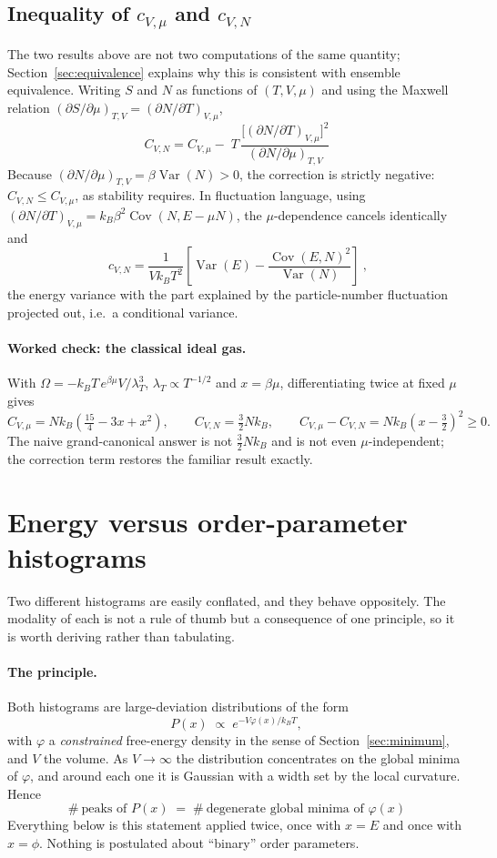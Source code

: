 \documentclass[10pt,a4paper]{article}
\theoremstyle{remark}
\newcommand{\Var}{\operatorname{Var}}
\newcommand{\Cov}{\operatorname{Cov}}
\begin{document}
\subsection{Inequality of \texorpdfstring{$c_{V,\mu}$}{cVmu} and \texorpdfstring{$c_{V,N}$}{cVN}}
\label{sec:caveat}

The two results above are not two computations of the same quantity;
Section~\ref{sec:equivalence} explains why this is consistent with ensemble
equivalence. Writing $S$ and $N$ as functions of $(T,V,\mu)$ and using the
Maxwell relation $(\partial S/\partial\mu)_{T,V}=(\partial N/\partial T)_{V,\mu}$,
\[
\;C_{V,N}=C_{V,\mu}
-\;T\,\frac{\big[(\partial N/\partial T)_{V,\mu}\big]^{2}}
{(\partial N/\partial\mu)_{T,V}}\
\]
Because $(\partial N/\partial\mu)_{T,V}=\beta\Var(N)>0$, the correction is
strictly negative: $C_{V,N}\leq C_{V,\mu}$, as stability requires. In fluctuation
language, using $(\partial N/\partial T)_{V,\mu}=k_B\beta^{2}\Cov(N,E-\mu N)$,
the $\mu$-dependence cancels identically and
\[
\;c_{V,N}=\frac{1}{Vk_BT^{2}}
\left[\Var(E)-\frac{\Cov(E,N)^{2}}{\Var(N)}\right]\ ,
\]
the energy variance with the part explained by the particle-number
fluctuation projected out, i.e.\ a conditional variance.

\paragraph{Worked check: the classical ideal gas.} With
$\Omega=-k_BT\,e^{\beta\mu}V/\lambda_T^{3}$, $\lambda_T\propto T^{-1/2}$ and
$x=\beta\mu$, differentiating twice at fixed $\mu$ gives
\[
C_{V,\mu}=Nk_B\left(\tfrac{15}{4}-3x+x^{2}\right),
\qquad
C_{V,N}=\tfrac{3}{2}Nk_B,
\qquad
C_{V,\mu}-C_{V,N}=Nk_B\left(x-\tfrac{3}{2}\right)^{2}\geq 0 .
\]
The naive grand-canonical answer is not $\tfrac32Nk_B$ and is not even
$\mu$-independent; the correction term restores the familiar result exactly.


\section{Energy versus order-parameter histograms}
\label{app:histograms}
Two different histograms are easily conflated, and they behave oppositely.
The modality of each is not a rule of thumb but a consequence of one principle,
so it is worth deriving rather than tabulating.

\paragraph{The principle.} Both histograms are large-deviation distributions of
the form
\[
P(x)\;\propto\;e^{-V\varphi(x)/k_BT} ,
\]
with $\varphi$ a \emph{constrained} free-energy density in the sense of
Section~\ref{sec:minimum}, and $V$ the volume. As $V\to\infty$ the distribution
concentrates on the global minima of $\varphi$, and around each one it is Gaussian
with a width set by the local curvature. Hence
\[
\;\#\ \text{peaks of }P(x)\;=\;\#\ \text{degenerate global minima of }
\varphi(x)\
\]
Everything below is this statement applied twice, once with $x=E$ and once with
$x=\phi$. Nothing is postulated about ``binary'' order parameters.
\end{document}
